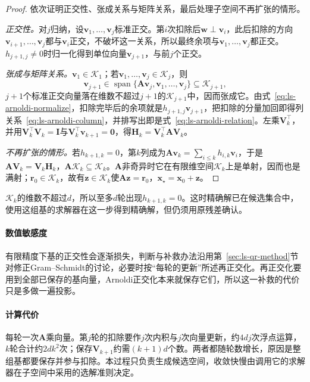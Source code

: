 \begin{proof}
依次证明正交性、张成关系与矩阵关系，最后处理子空间不再扩张的情形。

\emph{正交性。}对$j$归纳，设$\bm v_1,\ldots,\bm v_j$标准正交。第$i$次扣除后$\bm w\perp\bm v_i$，此后扣除的方向$\bm v_{i+1},\ldots,\bm v_j$都与$\bm v_i$正交，不破坏这一关系，所以最终余项与$\bm v_1,\ldots,\bm v_j$都正交。$h_{j+1,j}\ne0$时归一化得到单位向量$\bm v_{j+1}$，与前$j$个正交。

\emph{张成与矩阵关系。}$\bm v_1\in\mathcal K_1$；若$\bm v_1,\ldots,\bm v_j\in\mathcal K_j$，则
\[
 \bm v_{j+1}\in\operatorname{span}\{\bm A\bm v_j,\bm v_1,\ldots,\bm v_j\}\subseteq\mathcal K_{j+1},
\]
$j+1$个标准正交向量落在维数不超过$j+1$的$\mathcal K_{j+1}$中，因而张成它。由式~\eqref{eq:ls-arnoldi-normalize}，扣除完毕后的余项就是$h_{j+1,j}\bm v_{j+1}$，把扣除的分量加回即得列关系~\eqref{eq:ls-arnoldi-column}，并排写出即是式~\eqref{eq:ls-arnoldi-relation}。左乘$\bm V_k^\top$，并用$\bm V_k^\top\bm V_k=\bm I$与$\bm V_k^\top\bm v_{k+1}=\bm 0$，得$\bm H_k=\bm V_k^\top\bm A\bm V_k$。

\emph{不再扩张的情形。}若$h_{k+1,k}=0$，第$k$列成为$\bm A\bm v_k=\sum_{i\le k}h_{i,k}\bm v_i$，于是$\bm A\bm V_k=\bm V_k\bm H_k$，$\bm A\mathcal K_k\subseteq\mathcal K_k$。$\bm A$非奇异时它在有限维空间$\mathcal K_k$上是单射，因而也是满射；$\bm r_0\in\mathcal K_k$，故有$\bm z\in\mathcal K_k$使$\bm A\bm z=\bm r_0$，$\bm x_\star=\bm x_0+\bm z$。
\end{proof}

$\mathcal K_k$的维数不超过$d$，所以至多$d$轮出现$h_{k+1,k}=0$。这时精确解已在候选集合中，使用这组基的求解器在这一步得到精确解，但仍须用原残差确认。

\paragraph{数值敏感度}
有限精度下基的正交性会逐渐损失，判断与补救办法沿用第~\ref{sec:ls-qr-method}节对修正Gram--Schmidt的讨论，必要时按“每轮的更新”所述再正交化。再正交化要用到全部已保存的基向量，Arnoldi正交化本来就保存它们，所以这一补救的代价只是多做一遍投影。

\paragraph{计算代价}
每轮一次$\bm A$乘向量。第$j$轮的扣除要作$j$次内积与$j$次向量更新，约$4dj$次浮点运算，$k$轮合计约$2dk^2$次；保存$\bm V_{k+1}$约需$(k+1)d$个数。两者都随轮数增长，原因是整组基都要保存并参与扣除。本过程只负责生成候选空间，收敛快慢由调用它的求解器在子空间中采用的选解准则决定。

